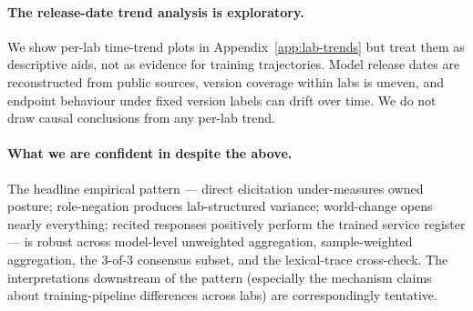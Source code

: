 \paragraph{The release-date trend analysis is exploratory.}
We show per-lab time-trend plots in Appendix~\ref{app:lab-trends} but treat them as descriptive aids, not as evidence for training trajectories. Model release dates are reconstructed from public sources, version coverage within labs is uneven, and endpoint behaviour under fixed version labels can drift over time. We do not draw causal conclusions from any per-lab trend.

\paragraph{What we are confident in despite the above.}
The headline empirical pattern --- direct elicitation under-measures owned posture; role-negation produces lab-structured variance; world-change opens nearly everything; recited responses positively perform the trained service register --- is robust across model-level unweighted aggregation, sample-weighted aggregation, the 3-of-3 consensus subset, and the lexical-trace cross-check. The interpretations downstream of the pattern (especially the mechanism claims about training-pipeline differences across labs) are correspondingly tentative.
